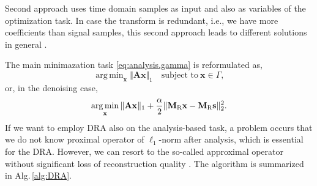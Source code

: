 \documentclass[conference]{IEEEtran}
\newcommand{\todo}[1]{\textcolor{red}{#1}}
\begin{document}
Second approach uses time domain samples as input and also as variables of the optimization task.
In case the transform is redundant, i.e., we have more coefficients than signal samples, this second approach leads to different solutions in general \cite{Mokry2020}. 

The main minimazation task \eqref{eq:analysis.gamma} is reformulated as,
\begin{equation}
	\label{eq:analysis.gamma}
	\mathop {\operatorname{arg \, min}}_\mathbf {x}\Vert \mathbf{A} \mathbf {x}\Vert _1 \quad \text{subject to}\ \mathbf {x}\in \Gamma,
\end{equation}
or, in the denoising case,
\begin{equation}
	\label{eq:analysis.dist}
	\mathop {\operatorname{arg \, min}}_\mathbf {x}\Vert \mathbf{A} \mathbf {x}\Vert _1 + \frac{\alpha}{2} \Vert \mathbf{M}_{\textup{R}} \mathbf {x} - \mathbf{M}_{\textup{R}} \mathbf{s} \Vert^2_2.
\end{equation} 
If we want to employ DRA also on the analysis-based task, a problem occurs
that we do not know proximal operator of $ \ell_1 $-norm after analysis, which is essential for the DRA.
However, we can resort to the so-called approximal operator without significant loss of reconstruction quality \cite{Mokry2021}.
The algorithm is summarized in Alg.\,\ref{alg:DRA}.
\end{document}

